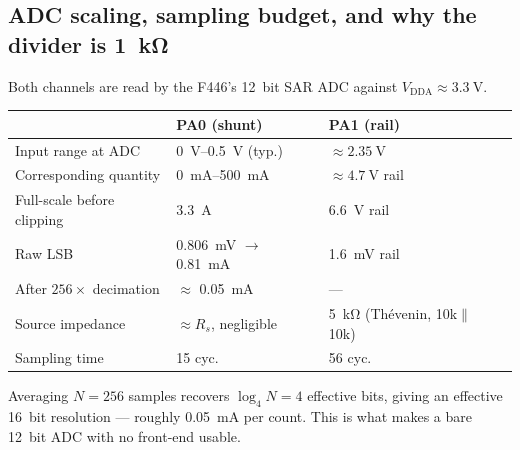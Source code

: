 \documentclass[11pt,a4paper]{article}
\begin{document}
\medskip
\noindent
{}

\subsection{ADC scaling, sampling budget, and why the divider is \SI{1}{\kilo\ohm}}
\label{sec:adc}

Both channels are read by the F446's \SI{12}{bit} SAR ADC against $V_\text{DDA}\approx\SI{3.3}{\volt}$.

\begin{center}
\begin{tabular}{llll}
\toprule
& \textbf{PA0 (shunt)} & \textbf{PA1 (rail)} \\
\midrule
Input range at ADC          & \SIrange{0}{0.5}{\volt} (typ.)  & $\approx\SI{2.35}{\volt}$ \\
Corresponding quantity      & \SIrange{0}{500}{\milli\ampere} & $\approx\SI{4.7}{\volt}$ rail \\
Full-scale before clipping  & \SI{3.3}{\ampere}               & \SI{6.6}{\volt} rail \\
Raw LSB                     & \SI{0.806}{\milli\volt} $\rightarrow$ \SI{0.81}{\milli\ampere} & \SI{1.6}{\milli\volt} rail \\
After $256\times$ decimation & $\approx$ \SI{0.05}{\milli\ampere} & --- \\
Source impedance            & $\approx R_s$, negligible        & \SI{5}{\kilo\ohm} (Th\'evenin, 10k$\|$10k) \\
Sampling time               & 15 cyc.                          & 56 cyc. \\
\bottomrule
\end{tabular}
\end{center}

\noindent
Averaging $N=256$ samples recovers $\log_4 N = 4$ effective bits, giving an effective
\SI{16}{bit} resolution --- roughly \SI{0.05}{\milli\ampere} per count. This is what makes a
bare \SI{12}{bit} ADC with no front-end usable.
\end{document}
